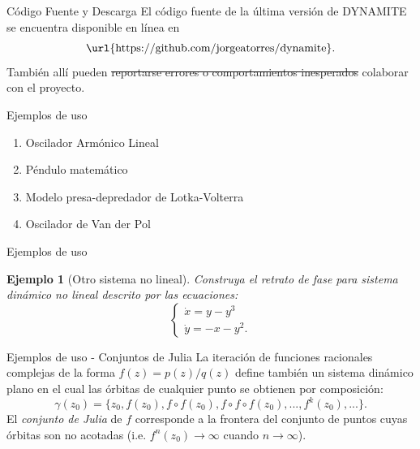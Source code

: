 \documentclass{beamer}
\newtheorem{exa}{Ejemplo}
\renewenvironment{example}{\begin{exa}}{\end{exa}}
\begin{document}
\begin{frame}{Código Fuente y Descarga}
El código fuente de la última versión de DYNAMITE se encuentra disponible en línea en
$$ \text{\url{https://github.com/jorgeatorres/dynamite}}. $$
También allí pueden \sout{reportarse errores o comportamientos inesperados} colaborar con el proyecto.
\end{frame}

\begin{frame}{Ejemplos de uso}
\begin{enumerate}
\item Oscilador Armónico Lineal
\item Péndulo matemático
\item Modelo presa-depredador de Lotka-Volterra
\item Oscilador de Van der Pol
\end{enumerate}
\end{frame}

\begin{frame}{Ejemplos de uso}
\begin{example}[Otro sistema no lineal]
Construya el retrato de fase para sistema dinámico no lineal descrito por las ecuaciones:
$$
\left \{
	\begin{array}{ll}
		\dot{x} = y - y^3 \\
		\dot{y} = -x - y^2.
	\end{array} \right.
$$
\end{example}
\end{frame}

\begin{frame}{Ejemplos de uso - Conjuntos de Julia}
La iteración de funciones racionales complejas de la forma $f(z) = p(z) / q(z)$ define también un sistema dinámico plano en el cual las órbitas de cualquier punto se obtienen por composición:
$$ \gamma(z_0) = \{z_0, f(z_0), f\circ f(z_0), f \circ f \circ f(z_0), ..., f^k(z_0), ...\}. $$
El \emph{conjunto de Julia} de $f$ corresponde a la frontera del conjunto de puntos cuyas órbitas son no acotadas (i.e. $f^n(z_0) \to \infty$ cuando $n \to \infty$).
\end{frame}

\end{document}
